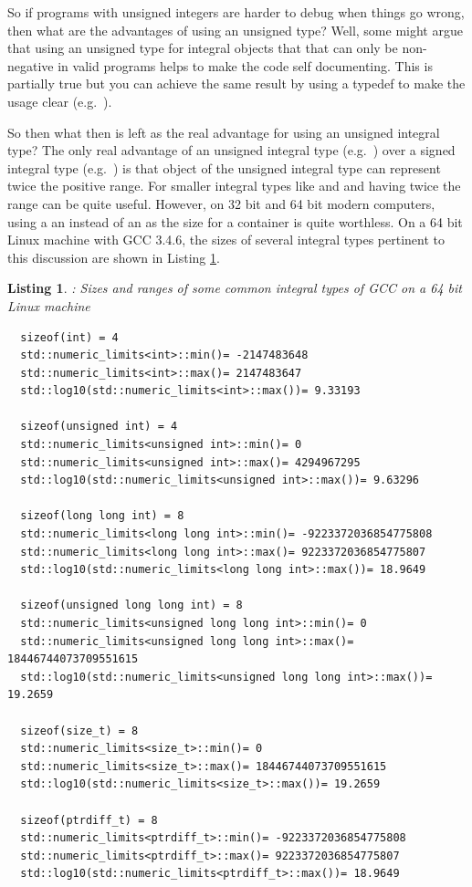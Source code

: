 \documentclass[pdf,ps2pdf,11pt]{SANDreport}
\newtheorem{listing}{Listing}
\begin{document}
So if programs with unsigned integers are harder to debug when things
go wrong, then what are the advantages of using an unsigned type?
Well, some might argue that using an unsigned type for integral
objects that that can only be non-negative in valid programs helps to
make the code self documenting.  This is partially true but you can
achieve the same result by using a typedef to make the usage clear
(e.g.\ {}).

So then what then is left as the real advantage for using an unsigned
integral type?  The only real advantage of an unsigned integral type
(e.g.\ {}) over a signed integral type (e.g.\
{}) is that object of the unsigned integral type can
represent twice the positive range.  For smaller integral types like
{}\ttt{char} and and {}\ttt{short int} having twice the range can be
quite useful.  However, on 32 bit and 64 bit modern computers, using a
an {}\ttt{unsigned int} instead of an {}\ttt{int} as the size for a
container is quite worthless.  On a 64 bit Linux machine with GCC
3.4.6, the sizes of several integral types pertinent to this
discussion are shown in Listing {}\ref{listing:integral-type-sizes}.


{}\begin{listing}: Sizes and ranges of some common integral types of
GCC on a 64 bit Linux machine
\label{listing:integral-type-sizes}
{\small\begin{verbatim}
  sizeof(int) = 4
  std::numeric_limits<int>::min()= -2147483648
  std::numeric_limits<int>::max()= 2147483647
  std::log10(std::numeric_limits<int>::max())= 9.33193
  
  sizeof(unsigned int) = 4
  std::numeric_limits<unsigned int>::min()= 0
  std::numeric_limits<unsigned int>::max()= 4294967295
  std::log10(std::numeric_limits<unsigned int>::max())= 9.63296
  
  sizeof(long long int) = 8
  std::numeric_limits<long long int>::min()= -9223372036854775808
  std::numeric_limits<long long int>::max()= 9223372036854775807
  std::log10(std::numeric_limits<long long int>::max())= 18.9649
  
  sizeof(unsigned long long int) = 8
  std::numeric_limits<unsigned long long int>::min()= 0
  std::numeric_limits<unsigned long long int>::max()= 18446744073709551615
  std::log10(std::numeric_limits<unsigned long long int>::max())= 19.2659
  
  sizeof(size_t) = 8
  std::numeric_limits<size_t>::min()= 0
  std::numeric_limits<size_t>::max()= 18446744073709551615
  std::log10(std::numeric_limits<size_t>::max())= 19.2659
  
  sizeof(ptrdiff_t) = 8
  std::numeric_limits<ptrdiff_t>::min()= -9223372036854775808
  std::numeric_limits<ptrdiff_t>::max()= 9223372036854775807
  std::log10(std::numeric_limits<ptrdiff_t>::max())= 18.9649
\end{verbatim}}
\end{listing}
\end{document}
